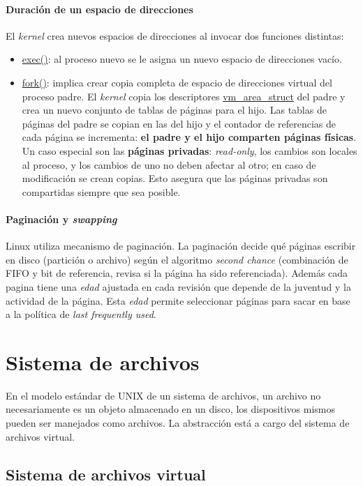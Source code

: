 \documentclass[spanish]{article}
\begin{document}
\paragraph{Duración de un espacio de direcciones} El \textit{kernel} crea nuevos espacios de direcciones al invocar dos funciones distintas:
\begin{itemize}
	\item \url{exec()}: al proceso nuevo se le asigna un nuevo espacio de direcciones vacío.
	\item \url{fork()}: implica crear copia completa de espacio de direcciones virtual del proceso padre. El \textit{kernel} copia los descriptores \url{vm_area_struct} del padre y crea un nuevo conjunto de tablas de páginas para el hijo. Las tablas de p\'{a}ginas del padre se copian en las del hijo y el contador de referencias de cada p\'{a}gina se incrementa: \textbf{el padre y el hijo comparten p\'{a}ginas f\'{i}sicas}. Un caso especial son las \textbf{páginas privadas}: \textit{read-only}, los cambios son locales al proceso, y los cambios de uno no deben afectar al otro; en caso de modificaci\'{o}n se crean copias. Esto asegura que las p\'{a}ginas privadas son compartidas siempre que sea posible.
\end{itemize}
\paragraph{Paginación y \textit{swapping}}Linux utiliza mecanismo de paginación. La paginación decide qué páginas escribir en disco (partición o archivo) según el algoritmo \textit{second chance} (combinación de FIFO y bit de referencia, revisa si la página ha sido referenciada). Además cada pagina tiene una \textit{edad} ajustada en cada revisión que depende de la juventud y la actividad de la página. Esta \textit{edad} permite seleccionar páginas para sacar en base a la política de \textit{last frequently used}.
\section{Sistema de archivos}

En el modelo est\'{a}ndar de UNIX de un sistema de archivos, un archivo no necesariamente es un objeto almacenado en un disco, los dispositivos mismos pueden ser manejados como archivos. La abstracci\'{o}n est\'{a} a cargo del sistema de archivos virtual.

\subsection{Sistema de archivos virtual}
\end{document}

